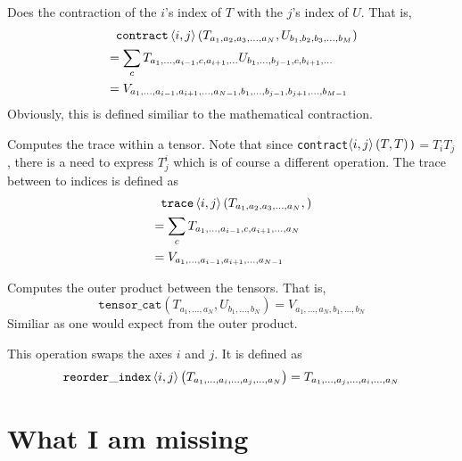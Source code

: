 \documentclass{article}
\begin{document}
\begin{description}[style=nextline]
\item[\texttt{contract$\braket{i,j}(T,U)$}]
Does the contraction of the $i$'s index of $T$ with the $j$'s index of $U$. That is,
\begin{align*}
&\phantom{=}
\mathtt{contract}\braket{i,j}\left(
   T_{a_1,a_2,a_3,\dots,a_N},
   U_{b_1,b_2,b_3,\dots,b_M}
\right) \\
&=
\sum_c
T_{a_1,\dots,a_{i-1},c,a_{i+1},\dots}
U_{b_1,\dots,b_{j-1},c,b_{i+1},\dots}
\\
&=
V_{a_1,\dots,a_{i-1},a_{i+1},\dots,a_{N-1},
   b_1,\dots,b_{j-1},b_{j+1},\dots,b_{M-1}}
\end{align*}
Obviously, this is defined similiar to the
mathematical contraction.

\item[\texttt{trace$\braket{i,j}(T)$}]
Computes the trace within a tensor. Note that
since
\texttt{contract$\braket{i,j}(T,T)$)}$=T_i T_j$,
there is a need to express $T^i_j$ which is
of course a different operation. The trace
between to indices is defined as
\begin{align*}
&\phantom{=}
\mathtt{trace}\braket{i,j}\left(
   T_{a_1,a_2,a_3,\dots,a_N},
\right) \\
&=
\sum_c
T_{a_1,\dots,a_{i-1},c,a_{i+1},\dots,a_N}
\\
&=
V_{a_1,\dots,a_{i-1},a_{i+1},\dots,a_{N-1}}
\end{align*}

\item[\texttt{tensor\_cat($T$,$U$)}]
Computes the outer product between the tensors.
That is,
\begin{equation*}
\mathtt{tensor\_cat}(
  T_{a_1,\dots,a_N},
  U_{b_1,\dots,b_N}
) = V_{a_1,\dots,a_N,b_1,\dots,b_N}
\end{equation*}
Similiar as one would expect from the outer
product.

\item[\texttt{reorder\_index<$i$,$j$>($T$)}]
This operation swaps the axes $i$ and $j$.
It is defined as
\begin{equation*}
\mathtt{reorder\_index}\braket{i,j}\left(
T_{a_1,\dots,a_i,\dots,a_j,\dots,a_N}
\right)
= T_{a_1,\dots,a_j,\dots,a_i,\dots,a_N}
\end{equation*}

\end{description}

\section{What I am missing}
\end{document}
